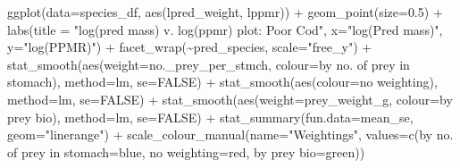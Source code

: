 \documentclass[
]{article}
\newenvironment{Shaded}{\begin{snugshade}}{\end{snugshade}}
\newcommand{\AttributeTok}[1]{\textcolor[rgb]{0.77,0.63,0.00}{#1}}
\newcommand{\ConstantTok}[1]{\textcolor[rgb]{0.00,0.00,0.00}{#1}}
\newcommand{\FloatTok}[1]{\textcolor[rgb]{0.00,0.00,0.81}{#1}}
\newcommand{\FunctionTok}[1]{\textcolor[rgb]{0.00,0.00,0.00}{#1}}
\newcommand{\NormalTok}[1]{#1}
\newcommand{\OtherTok}[1]{\textcolor[rgb]{0.56,0.35,0.01}{#1}}
\newcommand{\SpecialCharTok}[1]{\textcolor[rgb]{0.00,0.00,0.00}{#1}}
\newcommand{\StringTok}[1]{\textcolor[rgb]{0.31,0.60,0.02}{#1}}
\begin{document}
\begin{Shaded}
\begin{Highlighting}[]
\FunctionTok{ggplot}\NormalTok{(}\AttributeTok{data=}\NormalTok{species\_df, }\FunctionTok{aes}\NormalTok{(lpred\_weight, lppmr)) }\SpecialCharTok{+} 
  \FunctionTok{geom\_point}\NormalTok{(}\AttributeTok{size=}\FloatTok{0.5}\NormalTok{) }\SpecialCharTok{+}
  \FunctionTok{labs}\NormalTok{(}\AttributeTok{title =} \StringTok{"log(pred mass) v. log(ppmr) plot: Poor Cod"}\NormalTok{, }\AttributeTok{x=}\StringTok{"log(Pred mass)"}\NormalTok{, }\AttributeTok{y=}\StringTok{"log(PPMR)"}\NormalTok{) }\SpecialCharTok{+} 
  \FunctionTok{facet\_wrap}\NormalTok{(}\SpecialCharTok{\textasciitilde{}}\NormalTok{pred\_species, }\AttributeTok{scale=}\StringTok{"free\_y"}\NormalTok{) }\SpecialCharTok{+} 
  \FunctionTok{stat\_smooth}\NormalTok{(}\FunctionTok{aes}\NormalTok{(}\AttributeTok{weight=}\NormalTok{no.\_prey\_per\_stmch, }\AttributeTok{colour=}\StringTok{\textquotesingle{}by no. of prey in stomach\textquotesingle{}}\NormalTok{), }\AttributeTok{method=}\StringTok{\textquotesingle{}lm\textquotesingle{}}\NormalTok{, }\AttributeTok{se=}\ConstantTok{FALSE}\NormalTok{) }\SpecialCharTok{+}
  \FunctionTok{stat\_smooth}\NormalTok{(}\FunctionTok{aes}\NormalTok{(}\AttributeTok{colour=}\StringTok{\textquotesingle{}no weighting\textquotesingle{}}\NormalTok{), }\AttributeTok{method=}\StringTok{\textquotesingle{}lm\textquotesingle{}}\NormalTok{, }\AttributeTok{se=}\ConstantTok{FALSE}\NormalTok{) }\SpecialCharTok{+}
  \FunctionTok{stat\_smooth}\NormalTok{(}\FunctionTok{aes}\NormalTok{(}\AttributeTok{weight=}\NormalTok{prey\_weight\_g, }\AttributeTok{colour=}\StringTok{\textquotesingle{}by prey bio\textquotesingle{}}\NormalTok{), }\AttributeTok{method=}\StringTok{\textquotesingle{}lm\textquotesingle{}}\NormalTok{, }\AttributeTok{se=}\ConstantTok{FALSE}\NormalTok{) }\SpecialCharTok{+}
  \FunctionTok{stat\_summary}\NormalTok{(}\AttributeTok{fun.data=}\NormalTok{mean\_se, }\AttributeTok{geom=}\StringTok{"linerange"}\NormalTok{) }\SpecialCharTok{+}
  \FunctionTok{scale\_colour\_manual}\NormalTok{(}\AttributeTok{name=}\StringTok{"Weightings"}\NormalTok{,}
                     \AttributeTok{values=}\FunctionTok{c}\NormalTok{(}\StringTok{\textquotesingle{}by no. of prey in stomach\textquotesingle{}}\OtherTok{=}\StringTok{\textquotesingle{}blue\textquotesingle{}}\NormalTok{, }
                              \StringTok{\textquotesingle{}no weighting\textquotesingle{}}\OtherTok{=}\StringTok{\textquotesingle{}red\textquotesingle{}}\NormalTok{, }\StringTok{\textquotesingle{}by prey bio\textquotesingle{}}\OtherTok{=}\StringTok{\textquotesingle{}green\textquotesingle{}}\NormalTok{))}
\end{Highlighting}
\end{Shaded}
\end{document}
